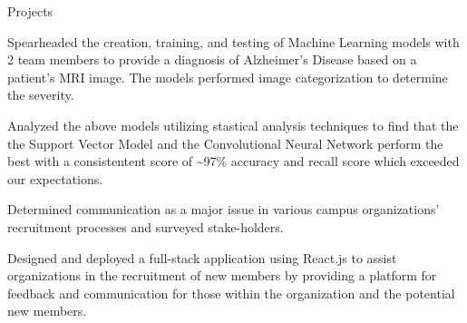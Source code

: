 \documentclass{resume} %
\begin{document}


\begin{workSection}{Projects}
    \customItem[
        title=Alzheimer's Disease Detection Project,
        duration=August 2023 - December 2023,
        keyHighlight=Machine Learning Models,
        location=Atlanta{,} GA
     ]
     \begin{bullets}
        \item Spearheaded the creation, training, and testing of Machine Learning models with 2 team members to provide a diagnosis of Alzheimer's Disease based on a patient's MRI image. The models performed image categorization to determine the severity.
        \item Analyzed the above models utilizing stastical analysis techniques to find that the the Support Vector Model and the Convolutional Neural Network perform the best with a consistentent score of \textasciitilde 97\% accuracy and recall score which exceeded our expectations.
     \end{bullets}

     \customItem[
        title=RushKit,
        duration=July 2022 - December 2022,
        keyHighlight=Recruitment Web Application,
        location=Atlanta{,} GA
     ]
     \begin{bullets}
        \item Determined communication as a major issue in various campus organizations' recruitment processes and surveyed stake-holders.
        \item Designed and deployed a full-stack application using React.js to assist organizations in the recruitment of new members by providing a platform for feedback and communication for those within the organization and the potential new members.
     \end{bullets}     
\end{workSection}

\end{document}
